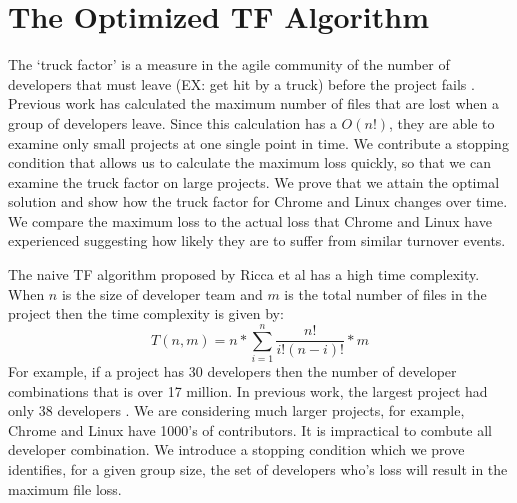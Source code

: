 \documentclass[12pt, a4paper, openright]{report}
\begin{document}
\backmatter

%




\appendix
\newpage
\section*{The Optimized TF Algorithm}
The `truck factor' is a measure in the agile community of the number of developers that must leave (EX: get hit by a truck) before the project fails \cite{Torchiano2011Wetsom}. Previous work has calculated the maximum number of files
that are lost when a group of developers leave. Since this calculation has a
$O(n!)$, they are able to examine only small projects at one single point in time.
We contribute a stopping condition that allows us to calculate the maximum loss
quickly, so that we can examine the truck factor on large projects. We prove
that we attain the optimal solution and show how the truck factor for Chrome and
Linux changes over time. We compare the maximum loss to the actual loss that
Chrome and Linux have experienced suggesting how likely they are to suffer from
similar turnover events.

The naive TF algorithm proposed by Ricca et al \cite{Ricca2011PROFES} has a high time complexity.
When $n$ is the size of developer team and $m$ is the total number of files in the project then the time complexity is given by:
\begin{equation}T(n,m) = n*\sum_{i=1}^n \frac{n!}{i!(n-i)!}*m\end{equation}
For example, if a project has 30 developers then the number of developer combinations that is over 17 million.
In previous work, the largest project had only 38 developers
\cite{Torchiano2011Wetsom}. We are considering much larger projects, for
example, Chrome and Linux have 1000's of contributors. It is impractical to
combute all developer combination.
We introduce a stopping condition which we prove identifies, for a given group size, the set of developers who's loss will result in the maximum file loss.
\end{document}
